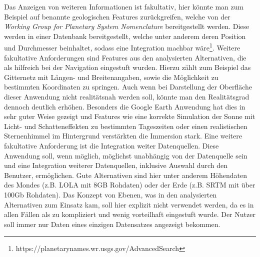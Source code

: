 Das Anzeigen von weiteren Informationen ist fakultativ, hier könnte man zum Beispiel auf benannte geologischen Features zurückgreifen, welche von der \textit{Working Group for Planetary System Nomenclature} bereitgestellt werden. Diese werden in einer Datenbank bereitgestellt, welche unter anderem deren Position und Durchmesser beinhaltet, sodass eine Integration machbar wäre\footnote{https://planetarynames.wr.usgs.gov/AdvancedSearch}. Weitere fakultative Anforderungen sind Features aus den analysierten Alternativen, die als hilfreich bei der Navigation eingestuft wurden. Hierzu zählt zum Beispiel das Gitternetz mit Längen- und Breitenangaben, sowie die Möglichkeit zu bestimmten Koordinaten zu springen. Auch wenn bei Darstellung der Oberfläche dieser Anwendung nicht realitätsnah werden soll, könnte man den Realitätsgrad dennoch deutlich erhöhen. Besonders die Google Earth Anwendung hat dies in sehr guter Weise gezeigt und Features wie eine korrekte Simulation der Sonne mit Licht- und Schatteneffekten zu bestimmten Tageszeiten oder einen realistischen Sternenhimmel im Hintergrund verstärkten die Immersion stark. Eine weitere fakultative Anforderung ist die Integration weiter Datenquellen. Diese Anwendung soll, wenn möglich, möglichst unabhängig von der Datenquelle sein und eine Integration weiterer Datenquellen, inklusive Auswahl durch den Benutzer, ermöglichen. Gute Alternativen sind hier unter anderem Höhendaten des Mondes (z.B. LOLA mit 8GB Rohdaten) oder der Erde (z.B. SRTM mit über 100Gb Rohdaten). Das Konzept von Ebenen, was in den analysierten Alternativen zum Einsatz kam, soll hier explizit nicht verwendet werden, da es in allen Fällen als zu kompliziert und wenig vorteilhaft eingestuft wurde. Der Nutzer soll immer nur Daten eines einzigen Datensatzes angezeigt bekommen.

